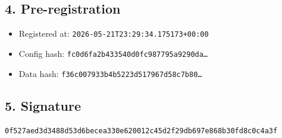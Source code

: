 \documentclass{article}
\begin{document}
\subsection*{4. Pre-registration}
\begin{itemize}
\item Registered at: \texttt{2026-05-21T23:29:34.175173+00:00}
\item Config hash: \texttt{fc0d6fa2b433540d0fc987795a9290da\dots}
\item Data hash: \texttt{f36c007933b4b5223d517967d58c7b80\dots}
\end{itemize}
\subsection*{5. Signature}
\texttt{0f527aed3d3488d53d6becea330e620012c45d2f29db697e868b30fd8c0c4a3f}\\
\end{document}
